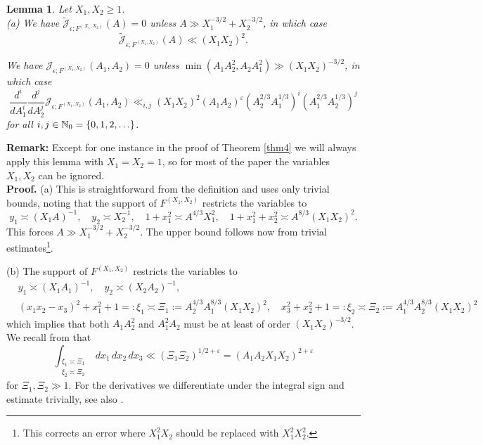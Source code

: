 \documentclass[11pt]{amsart}
\theoremstyle{plain}
\newtheorem{lemma}{Lemma}
\numberwithin{equation}{section}
\theoremstyle{definition}
\renewcommand{\geq}{\geqslant}
\begin{document}
\begin{lemma}\label{J1} Let $X_1, X_2 \geq 1$. \\
 {\rm (a)} We have  $\tilde{\mathcal{J}}_{\epsilon; F^{(X_1, X_2)}}(A) = 0$  unless $A \gg X_1^{-3/2} + X_2^{-3/2}$, in which case $$  \tilde{\mathcal{J}}_{\epsilon; F^{(X_1, X_2)}}(A) \ll (X_1X_2)^2. $$

 We have  $\mathcal{J}_{\epsilon;F^{(X_1, X_2)}}(A_1, A_2) = 0$  unless $\min(A_1 A_2^2, A_2A_1^2)  \gg (X_1X_2)^{-3/2}$, in which case $$\frac{d^i}{dA_1^i}  \frac{d^j}{  dA_2^j} \mathcal{J}_{\epsilon; F^{(X_1, X_2)}}(A_1, A_2) \ll_{i, j}  (X_1X_2)^2(A_1A_2)^{\varepsilon} \left(A_2^{2/3} A_1^{1/3}\right)^i\left(A_1^{2/3} A_2^{1/3}\right)^j$$
for all $i, j \in \Bbb{N}_0 = \{0,1, 2, \ldots\}$. 
\end{lemma}

\textbf{Remark:} Except for one instance in the proof of Theorem \ref{thm4} we will always apply this lemma with $X_1 = X_2 = 1$, so for  most of the paper the variables $X_1, X_2$ can be ignored. \\%

\textbf{Proof.} (a) This is straightforward from the definition and uses only trivial bounds, noting that the support of $F^{(X_1, X_2)}$ restricts the variables to
$$y_1 \asymp (X_1A)^{-1}, \quad y_2 \asymp X_2^{-1}, \quad 1 + x_1^2 \asymp A^{4/3}X_1^2, \quad 1 + x_1^2 + x_2^2 \asymp A^{8/3}(X_1X_2)^2.$$
This forces $A \gg X_1^{-3/2} + X_2^{-3/2}$. The upper bound follows now from trivial estimates\footnote{This corrects an error \cite[(8.7)]{Bl} where $X_1^2 X_2$ should be replaced with $X_1^2X_2^2$.}.

(b)  The support of $F^{(X_1, X_2)}$ restricts the variables to
\begin{displaymath}
\begin{split}
& y_1 \asymp (X_1A_1)^{-1}, \quad y_2 \asymp (X_2A_2)^{-1}, \\
& (x_1x_2 - x_3)^2 + x_1^2 + 1 =: \xi_1  \asymp \Xi_1 := A_2^{4/3} A_1^{8/3}(X_1X_2)^2,
\quad  x_3^2 + x_2^2 + 1 =:\xi_2 \asymp \Xi_2 := A_1^{4/3} A_2^{8/3}(X_1X_2)^2
\end{split}
\end{displaymath}
which implies that both $A_1A_2^2$ and $A_1^2 A_2$ must be at least of order $(X_1X_2)^{-3/2}$. 
We recall from \cite[Lemma 4]{Bl} that
\begin{equation}\label{lemma4}
\int_{\substack{\xi_1 \asymp \Xi_1\\ \xi_2 \asymp \Xi_2}} dx_1\, dx_2\, dx_3 \ll (\Xi_1\Xi_2)^{1/2 + \varepsilon} =(A_1A_2X_1X_2)^{2+\varepsilon}
\end{equation}
for $\Xi_1, \Xi_2 \gg 1$. For the derivatives we differentiate under the integral sign and estimate  trivially, see also \cite[(8.16)]{Bl}. \\
\end{document}
